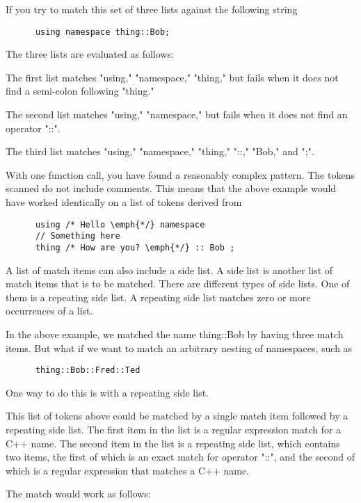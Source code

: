 If you try to match this set of three lists against the following string

\small{\begin{verbatim}
      using namespace thing::Bob;
\end{verbatim}}

The three lists are evaluated as follows:

The first list matches "using," "namespace," "thing," but fails when it does
not find a semi-colon following "thing."

The second list matches "using," "namespace," but fails when it does not find
an operator "::".

The third list matches "using," "namespace," "thing," "::," "Bob," and ";".

With one function call, you have found a reasonably complex pattern.  The
tokens scanned do not include comments.  This means that the above example
would have worked identically on a list of tokens derived from

\small{\begin{verbatim}
      using /* Hello \emph{*/} namespace
      // Something here
      thing /* How are you? \emph{*/} :: Bob ;
\end{verbatim}}

A list of match items can also include a side list.  A side list is another
list of match items that is to be matched.  There are different types of side
lists.  One of them is a repeating side list.  A repeating side list matches
zero or more occurrences of a list.

In the above example, we matched the name thing::Bob by having three match
items.  But what if we want to match an arbitrary nesting of namespaces, such
as

\small{\begin{verbatim}
      thing::Bob::Fred::Ted
\end{verbatim}}

One way to do this is with a repeating side list.

This list of tokens above could be matched by a single match item followed by
a repeating side list.  The first item in the list is a regular expression
match for a C++ name.  The second item in the list is a repeating side list,
which contains two items, the first of which is an exact match for operator
"::", and the second of which is a regular expression that matches a C++
name.

The match would work as follows:

